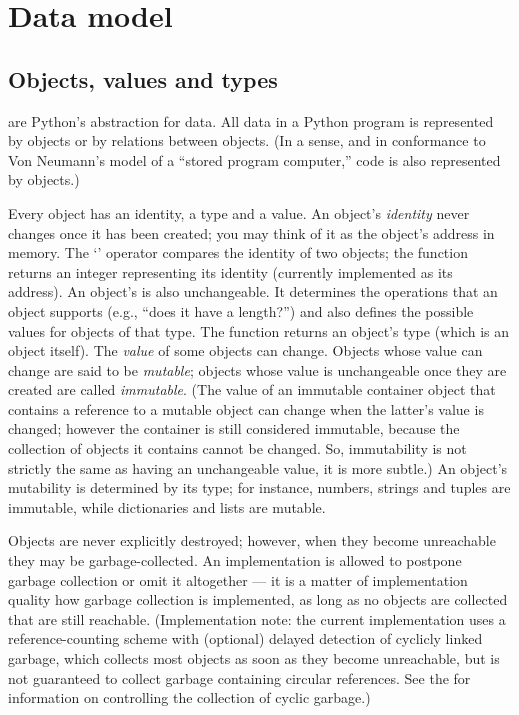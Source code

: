 \chapter{Data model\label{datamodel}}


\section{Objects, values and types\label{objects}}

 are Python's abstraction for data.  All data in a Python
program is represented by objects or by relations between objects.
(In a sense, and in conformance to Von Neumann's model of a
``stored program computer,'' code is also represented by objects.)

Every object has an identity, a type and a value.  An object's
\emph{identity} never changes once it has been created; you may think
of it as the object's address in memory.  The `' operator
compares the identity of two objects; the
 function returns an integer
representing its identity (currently implemented as its address).
An object's  is
also unchangeable.  It determines the operations that an object
supports (e.g., ``does it have a length?'') and also defines the
possible values for objects of that type.  The
 function returns an object's type
(which is an object itself).  The \emph{value} of some
objects can change.  Objects whose value can change are said to be
\emph{mutable}; objects whose value is unchangeable once they are
created are called \emph{immutable}.
(The value of an immutable container object that contains a reference
to a mutable object can change when the latter's value is changed;
however the container is still considered immutable, because the
collection of objects it contains cannot be changed.  So, immutability
is not strictly the same as having an unchangeable value, it is more
subtle.)
An object's mutability is determined by its type; for instance,
numbers, strings and tuples are immutable, while dictionaries and
lists are mutable.

Objects are never explicitly destroyed; however, when they become
unreachable they may be garbage-collected.  An implementation is
allowed to postpone garbage collection or omit it altogether --- it is
a matter of implementation quality how garbage collection is
implemented, as long as no objects are collected that are still
reachable.  (Implementation note: the current implementation uses a
reference-counting scheme with (optional) delayed detection of
cyclicly linked garbage, which collects most objects as soon as they
become unreachable, but is not guaranteed to collect garbage
containing circular references.  See the
 for
information on controlling the collection of cyclic garbage.)

